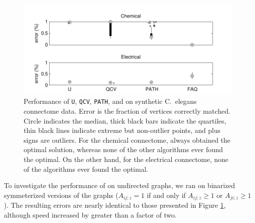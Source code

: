 \documentclass[10pt,journal,cspaper,compsoc]{IEEEtran}
\begin{document}
\begin{figure}[htbp]
	\centering
		\includegraphics[width=1.0\linewidth]{../figs/connectomes.pdf}
	\caption{Performance of \texttt{U}, \texttt{QCV}, \texttt{PATH}, and \FAQ on synthetic C.~elegans connectome data.  Error is the fraction of vertices correctly matched.  Circle indicates the median, thick black bars indicate the quartiles, thin black lines indicate extreme but non-outlier points, and plus signs are outliers.	For the chemical connectome, \FAQ always obtained the optimal solution, whereas none of the other algorithms ever found the optimal.  On the other hand, for the electrical connectome, none of the algorithms ever found the optimal.}
	\label{fig:connectomes}
\end{figure}


% 

To investigate the performance of \FAQ on undirected graphs, we ran \FAQ on binarized symmeterized versions of the graphs ($A_{ij;z}=1$ if and only if $A_{ij;z}\geq 1$ or $A_{ji;z} \geq 1$).  The resulting errors are nearly identical to those presented in Figure \ref{fig:connectomes}, although speed increased by greater than a factor of two.
\end{document}
